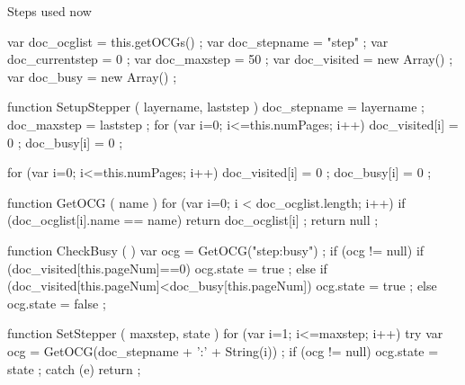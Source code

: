


\startJSpreamble Steps used now

    var doc_ocglist     = this.getOCGs() ;
    var doc_stepname    = "step" ;
    var doc_currentstep =  0 ;
    var doc_maxstep     = 50 ;
    var doc_visited     = new Array() ;
    var doc_busy        = new Array() ;

    function SetupStepper ( layername, laststep ) {
        doc_stepname = layername ;
        doc_maxstep  = laststep ;
        for (var i=0; i<=this.numPages; i++) {
            doc_visited[i] = 0 ;
            doc_busy[i] = 0 ;
        }
    }

    for (var i=0; i<=this.numPages; i++) {
        doc_visited[i] = 0 ;
        doc_busy[i] = 0 ;
    }

    function GetOCG ( name ) {
        for (var i=0; i < doc_ocglist.length; i++) {
            if (doc_ocglist[i].name == name) {
                return doc_ocglist[i] ;
            }
        }
        return null ;
    }

    function CheckBusy ( ) {
         var ocg = GetOCG("step:busy") ;
         if (ocg != null) {
             if (doc_visited[this.pageNum]==0) {
                 ocg.state = true ;
             } else {
                 if (doc_visited[this.pageNum]<doc_busy[this.pageNum]) {
                     ocg.state = true ;
                 } else {
                     ocg.state = false ;
                 }
             }
         }
    }

    function SetStepper ( maxstep, state ) {
        for (var i=1; i<=maxstep; i++) {
            try {
                var ocg = GetOCG(doc_stepname + ':' + String(i)) ;
                if (ocg != null) {
                    ocg.state = state ;
                }
            } catch (e) {
                return ;
            }
        }
    }

